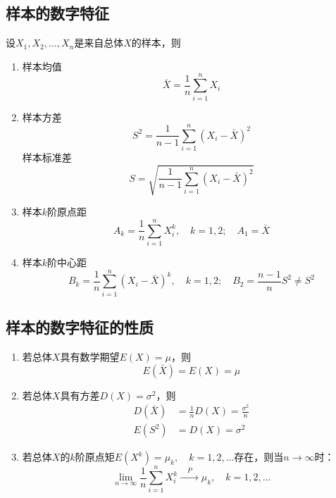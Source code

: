 \subsection{样本的数字特征}
设$X_1, X_2, \dots, X_n$是来自总体$X$的样本，则
\begin{enumerate}
	\item 样本均值
	\begin{equation}
		\bar X = \frac{1}{n}\sum_{i=1}^{n} X_i
	\end{equation}

	\item 样本方差
	\begin{equation}
		S^2 = \frac{1}{n-1}\sum_{i=1}^{n}(X_i - \bar X)^2
	\end{equation}
	样本标准差
	\begin{equation}
		S = \sqrt{\frac{1}{n-1}\sum_{i=1}^{n}(X_i - \bar X)^2}
	\end{equation}

	\item 样本$k$阶原点距
	\begin{equation}
		A_k = \frac{1}{n}\sum_{i=1}^{n}X_i^k, \quad k = 1, 2; \quad A_1 = \bar X
	\end{equation}

	\item 样本$k$阶中心距
	\begin{equation}
		B_k = \frac{1}{n}\sum_{i=1}^{n}(X_i - \bar X)^k, \quad k = 1, 2; \quad B_2 = \frac{n-1}{n}S^2 \neq S^2
	\end{equation}
\end{enumerate}

\subsection{样本的数字特征的性质}
\begin{enumerate}
	\item 若总体$X$具有数学期望$E(X)=\mu$，则
	\begin{equation}
		E(\bar X) = E(X) = \mu
	\end{equation}
	\item 若总体$X$具有方差$D(X)=\sigma^2$，则
	\begin{align}
		D(\bar X) &= \frac{1}{n}D(X) = \frac{\sigma^2}{n} \\
		E(S^2) &= D(X) = \sigma^2
	\end{align}
	\item 若总体$X$的$k$阶原点矩$E(X^k) = \mu_k, \quad k = 1, 2, \dots$存在，则当$n \to \infty$时：
	\begin{equation}
		\lim_{n\to \infty} \frac{1}{n}\sum_{i=1}^{n}X_i^k \xrightarrow{\quad P \quad} \mu_k, \quad k = 1, 2, \dots
	\end{equation}
\end{enumerate}























